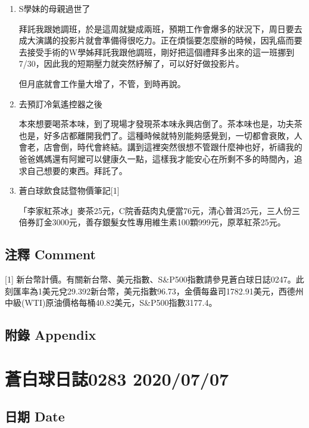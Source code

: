 \documentclass[a5paper, 11pt
]{book}
\begin{document}
\begin{enumerate}
\def\labelenumi{\arabic{enumi}.}
\item
  S學妹的母親過世了

  拜託我跟她調班，於是這周就變成兩班，預期工作會爆多的狀況下，周日要去成大演講的投影片就會準備得很吃力。正在煩惱要怎麼辦的時候，因乳癌而要去接受手術的W學姊拜託我跟他調班，剛好把這個禮拜多出來的這一班挪到7/30，因此我的短期壓力就突然紓解了，可以好好做投影片。

  但月底就會工作量大增了，不管，到時再說。
\item
  去預訂冷氣遙控器之後

  本來想要喝茶本味，到了現場才發現茶本味永興店倒了。茶本味也是，功夫茶也是，好多店都離開我們了。這種時候就特別能夠感覺到，一切都會衰敗，人會老，店會倒，時代會終結。講到這裡突然很想不管跟什麼神也好，祈禱我的爸爸媽媽還有阿嬤可以健康久一點，這樣我才能安心在所剩不多的時間內，追求自己想要的東西。拜託了。
\item
  蒼白球飲食誌暨物價筆記{[}1{]}

  「李家紅茶冰」麥茶25元，C院香菇肉丸便當76元，清心普洱25元，三人份三倍券訂金3000元，善存銀髮女性專用維生素100顆999元，原萃紅茶25元。
\end{enumerate}

\hypertarget{ux6ce8ux91cb-comment-35}{%
\subsection{注釋 Comment}\label{ux6ce8ux91cb-comment-35}}

{[}1{]}
新台幣計價。有關新台幣、美元指數、S\&P500指數請參見蒼白球日誌0247。此刻匯率為1美元兌29.392新台幣，美元指數96.73，金價每盎司1782.91美元，西德州中級(WTI)原油價格每桶40.82美元，S\&P500指數3177.4。

\hypertarget{ux9644ux9304-appendix-35}{%
\subsection{附錄 Appendix}\label{ux9644ux9304-appendix-35}}

\hypertarget{ux84bcux767dux7403ux65e5ux8a8c0283-20200707}{%
\section{蒼白球日誌0283
2020/07/07}\label{ux84bcux767dux7403ux65e5ux8a8c0283-20200707}}

\hypertarget{ux65e5ux671f-date-36}{%
\subsection{日期 Date}\label{ux65e5ux671f-date-36}}
\end{document}
